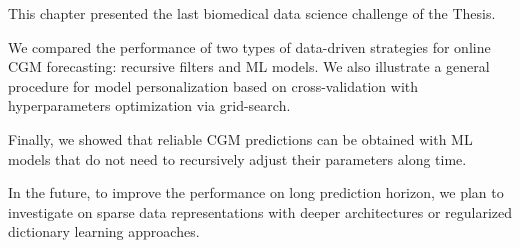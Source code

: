 This chapter presented the last biomedical data science challenge of the Thesis.

We compared the performance of two types of data-driven strategies for online CGM forecasting: recursive filters and ML models. We also illustrate a general procedure for model personalization based on cross-validation with hyperparameters optimization via grid-search.

Finally, we showed that reliable CGM predictions can be obtained with ML models that do not need to recursively adjust their parameters along time.

In the future, to improve the performance on long prediction horizon, we plan to investigate on sparse data representations with deeper architectures or regularized dictionary learning approaches.

